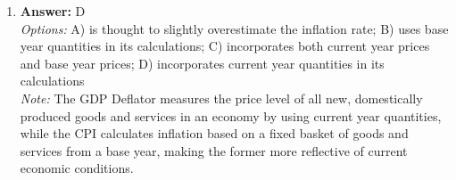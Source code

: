 \documentclass[12pt]{article}
\begin{document}
\begin{enumerate}[label=\arabic*.]
\\ \textit{Options:} A) the United States to be a net exporter of copper.; B) the United States to impose a tariff on imported copper to protect domestic producers.; C) the demand for U.S. copper to fall.; D) a growing trade deficit in the United States in goods and services.
\\ \textit{Note:} When the world price of copper is higher than the domestic price, it incentivizes U.S. producers to export copper to take advantage of the higher prices abroad, leading to the United States becoming a net exporter of copper.
\item \textbf{Answer:} D
\\ \textit{Options:} A) is thought to slightly overestimate the inflation rate; B) uses base year quantities in its calculations; C) incorporates both current year prices and base year prices; D) incorporates current year quantities in its calculations
\\ \textit{Note:} The GDP Deflator measures the price level of all new, domestically produced goods and services in an economy by using current year quantities, while the CPI calculates inflation based on a fixed basket of goods and services from a base year, making the former more reflective of current economic conditions.
\end{enumerate}
\end{document}
